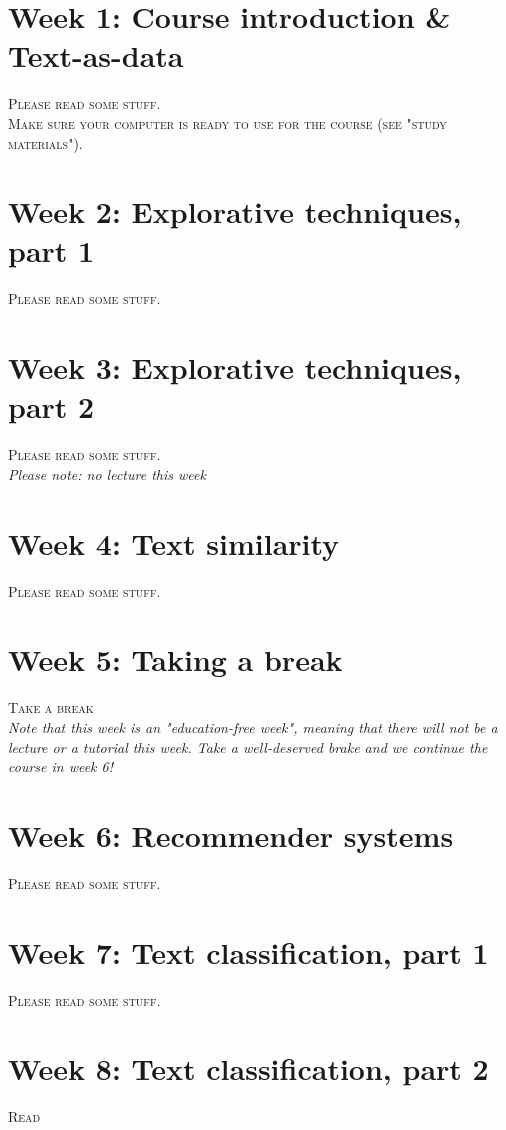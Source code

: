 



\section*{Week 1: Course introduction \& Text-as-data}
\textsc{ Please read some stuff.}\\
\textsc{ Make sure your computer is ready to use for the course (see "study materials").}\\

\section*{Week 2: Explorative techniques, part 1}
\textsc{ Please read some stuff.}\\

\section*{Week 3: Explorative techniques, part 2}
\textsc{ Please read some stuff.}\\

\emph{Please note: no lecture this week}

\section*{Week 4: Text similarity}
\textsc{ Please read some stuff.}\\


\section*{Week 5: Taking a break}
\textsc{ Take a break}\\

\emph{Note that this week is an "education-free week", meaning that there will not be a lecture or a tutorial this week. Take a well-deserved brake and we continue the course in week 6!}

\section*{Week 6: Recommender systems}
\textsc{ Please read some stuff.}\\


\section*{Week 7: Text classification, part 1}
\textsc{ Please read some stuff.}\\


\section*{Week 8: Text classification, part 2}
\textsc{ Read \cite{van_zoonen_social_2016}}




